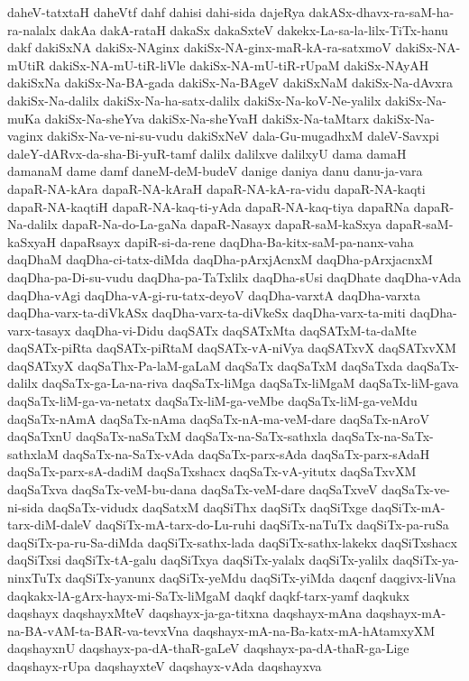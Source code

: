 {daheV-tatxtaH
daheVtf
dahf
dahisi
dahi-sida
dajeRya
dakASx-dhavx-ra-saM-ha-ra-nalalx
dakAa
dakA-rataH
dakaSx
dakaSxteV
dakekx-La-sa-la-lilx-TiTx-hanu
dakf
dakiSxNA
dakiSx-NAginx
dakiSx-NA-ginx-maR-kA-ra-satxmoV
dakiSx-NA-mUtiR
dakiSx-NA-mU-tiR-liVle
dakiSx-NA-mU-tiR-rUpaM
dakiSx-NAyAH
dakiSxNa
dakiSx-Na-BA-gada
dakiSx-Na-BAgeV
dakiSxNaM
dakiSx-Na-dAvxra
dakiSx-Na-dalilx
dakiSx-Na-ha-satx-dalilx
dakiSx-Na-koV-Ne-yalilx
dakiSx-Na-muKa
dakiSx-Na-sheYva
dakiSx-Na-sheYvaH
dakiSx-Na-taMtarx
dakiSx-Na-vaginx
dakiSx-Na-ve-ni-su-vudu
dakiSxNeV
dala-Gu-mugadhxM
daleV-Savxpi
daleY-dARvx-da-sha-Bi-yuR-tamf
dalilx
dalilxve
dalilxyU
dama
damaH
damanaM
dame
damf
daneM-deM-budeV
danige
daniya
danu
danu-ja-vara
dapaR-NA-kAra
dapaR-NA-kAraH
dapaR-NA-kA-ra-vidu
dapaR-NA-kaqti
dapaR-NA-kaqtiH
dapaR-NA-kaq-ti-yAda
dapaR-NA-kaq-tiya
dapaRNa
dapaR-Na-dalilx
dapaR-Na-do-La-gaNa
dapaR-Nasayx
dapaR-saM-kaSxya
dapaR-saM-kaSxyaH
dapaRsayx
dapiR-si-da-rene
daqDha-Ba-kitx-saM-pa-nanx-vaha
daqDhaM
daqDha-ci-tatx-diMda
daqDha-pArxjAcnxM
daqDha-pArxjacnxM
daqDha-pa-Di-su-vudu
daqDha-pa-TaTxlilx
daqDha-sUsi
daqDhate
daqDha-vAda
daqDha-vAgi
daqDha-vA-gi-ru-tatx-deyoV
daqDha-varxtA
daqDha-varxta
daqDha-varx-ta-diVkASx
daqDha-varx-ta-diVkeSx
daqDha-varx-ta-miti
daqDha-varx-tasayx
daqDha-vi-Didu
daqSATx
daqSATxMta
daqSATxM-ta-daMte
daqSATx-piRta
daqSATx-piRtaM
daqSATx-vA-niVya
daqSATxvX
daqSATxvXM
daqSATxyX
daqSaThx-Pa-laM-gaLaM
daqSaTx
daqSaTxM
daqSaTxda
daqSaTx-dalilx
daqSaTx-ga-La-na-riva
daqSaTx-liMga
daqSaTx-liMgaM
daqSaTx-liM-gava
daqSaTx-liM-ga-va-netatx
daqSaTx-liM-ga-veMbe
daqSaTx-liM-ga-veMdu
daqSaTx-nAmA
daqSaTx-nAma
daqSaTx-nA-ma-veM-dare
daqSaTx-nAroV
daqSaTxnU
daqSaTx-naSaTxM
daqSaTx-na-SaTx-sathxla
daqSaTx-na-SaTx-sathxlaM
daqSaTx-na-SaTx-vAda
daqSaTx-parx-sAda
daqSaTx-parx-sAdaH
daqSaTx-parx-sA-dadiM
daqSaTxshacx
daqSaTx-vA-yitutx
daqSaTxvXM
daqSaTxva
daqSaTx-veM-bu-dana
daqSaTx-veM-dare
daqSaTxveV
daqSaTx-ve-ni-sida
daqSaTx-vidudx
daqSatxM
daqSiThx
daqSiTx
daqSiTxge
daqSiTx-mA-tarx-diM-daleV
daqSiTx-mA-tarx-do-Lu-ruhi
daqSiTx-naTuTx
daqSiTx-pa-ruSa
daqSiTx-pa-ru-Sa-diMda
daqSiTx-sathx-lada
daqSiTx-sathx-lakekx
daqSiTxshacx
daqSiTxsi
daqSiTx-tA-galu
daqSiTxya
daqSiTx-yalalx
daqSiTx-yalilx
daqSiTx-ya-ninxTuTx
daqSiTx-yanunx
daqSiTx-yeMdu
daqSiTx-yiMda
daqcnf
daqgivx-liVna
daqkakx-lA-gArx-hayx-mi-SaTx-liMgaM
daqkf
daqkf-tarx-yamf
daqkukx
daqshayx
daqshayxMteV
daqshayx-ja-ga-titxna
daqshayx-mAna
daqshayx-mA-na-BA-vAM-ta-BAR-va-tevxVna
daqshayx-mA-na-Ba-katx-mA-hAtamxyXM
daqshayxnU
daqshayx-pa-dA-thaR-gaLeV
daqshayx-pa-dA-thaR-ga-Lige
daqshayx-rUpa
daqshayxteV
daqshayx-vAda
daqshayxva
}
